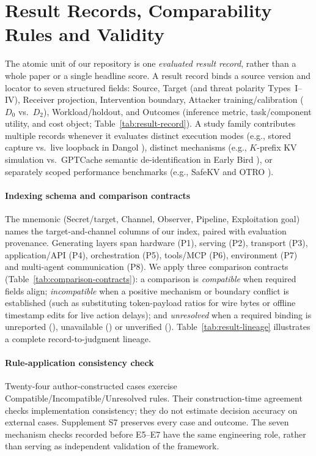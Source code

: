 \section{Result Records, Comparability Rules and Validity}\label{sec:scope}
The atomic unit of our repository is one \emph{evaluated result record}, rather than a whole paper or a single headline score. A result record binds a source version and locator to seven structured fields: Source, Target (and threat polarity Types~I--IV), Receiver projection, Intervention boundary, Attacker training/calibration ($D_0$ vs.\ $D_2$), Workload/holdout, and Outcomes (inference metric, task/component utility, and cost object; Table~\ref{tab:result-record}). A study family contributes multiple records whenever it evaluates distinct execution modes (e.g., stored capture vs.\ live loopback in Dangol \cite{dangol2026workflow}), distinct mechanisms (e.g., $K$-prefix KV simulation vs.\ GPTCache semantic de-identification in Early Bird \cite{earlybird2025}), or separately scoped performance benchmarks (e.g., SafeKV \cite{chu2025safekv} and OTRO \cite{lee2026otro}).


\paragraph{Indexing schema and comparison contracts}
The mnemonic \scope{} (Secret/target, Channel, Observer, Pipeline, Exploitation goal) names the target-and-channel columns of our index, paired with evaluation provenance. Generating layers span hardware (P1), serving (P2), transport (P3), application/API (P4), orchestration (P5), tools/MCP (P6), environment (P7) and multi-agent communication (P8). We apply three comparison contracts (Table~\ref{tab:comparison-contracts}): a comparison is \emph{compatible} when required fields align; \emph{incompatible} when a positive mechanism or boundary conflict is established (such as substituting token-payload ratios for wire bytes or offline timestamp edits for live action delays); and \emph{unresolved} when a required binding is unreported (\NRR{}), unavailable (\NRA{}) or unverified (\NRV{}). Table~\ref{tab:result-lineage} illustrates a complete record-to-judgment lineage.




\paragraph{Rule-application consistency check}
Twenty-four author-constructed cases exercise Compatible/Incompatible/Unresolved rules. Their construction-time agreement checks implementation consistency; they do not estimate decision accuracy on external cases. Supplement S7 preserves every case and outcome. The seven mechanism checks recorded before E5--E7 have the same engineering role, rather than serving as independent validation of the framework.

